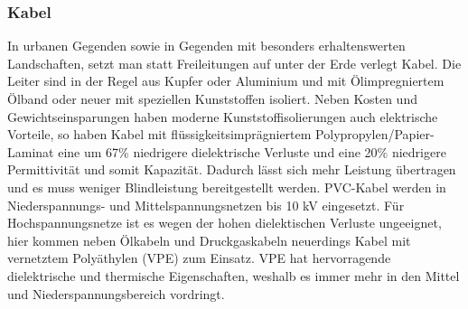 \subsubsection{Kabel}
In urbanen Gegenden sowie in Gegenden mit besonders erhaltenswerten Landschaften, setzt man statt Freileitungen auf unter der Erde verlegt Kabel. Die Leiter sind in der Regel aus Kupfer oder Aluminium und mit Ölimpregniertem Ölband oder neuer mit speziellen Kunststoffen isoliert. %
Neben Kosten und Gewichtseinsparungen haben moderne Kunststoffisolierungen auch elektrische Vorteile, so haben Kabel mit flüssigkeitsimprägniertem Polypropylen/Papier-Laminat eine um 67\% niedrigere dielektrische Verluste und eine 20\% niedrigere Permittivität und somit Kapazität.\cite{Harrison} Dadurch lässt sich mehr Leistung übertragen und es muss weniger Blindleistung bereitgestellt werden.
PVC-Kabel werden in Niederspannungs- und Mittelspannungsnetzen bis 10 kV eingesetzt. Für Hochspannungsnetze ist es wegen der hohen dielektischen Verluste ungeeignet, hier kommen neben Ölkabeln und Druckgaskabeln neuerdings Kabel mit vernetztem Polyäthylen (VPE) zum Einsatz. VPE hat hervorragende dielektrische und thermische Eigenschaften, weshalb es immer mehr in den Mittel und Niederspannungsbereich vordringt.\cite{Flosdorff}

